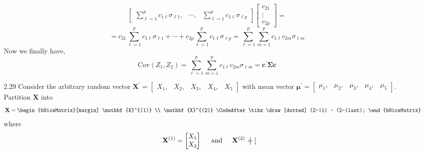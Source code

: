 \begin{enumerate}[font=\bfseries]
\[\begin{bmatrix}
                \sum_{\ell=1}^{p}{c_{1\ell}\sigma_{\ell 1}}, & \cdots, & \sum_{\ell=1}^{p}{c_{1\ell}\sigma_{\ell p}}
            \end{bmatrix}
            \begin{bmatrix}
                c_{21} \\
                \vdots \\
                c_{2p}
            \end{bmatrix}
            =
        \]
        \[
            =
            c_{21}\sum_{\ell=1}^{p}{c_{1\ell}\sigma_{\ell 1}} + \cdots + c_{2p}\sum_{\ell=1}^{p}{c_{1\ell}\sigma_{\ell p}}
            =
            \sum_{\ell=1}^{p}{\sum_{m=1}^{p}{c_{1\ell}c_{2m}\sigma_{\ell m}}}
        \]
        Now we finally have,
        \[
            \text{Cov}\left(Z_1, Z_2\right)
            =
            \sum_{\ell=1}^{p}{\sum_{m=1}^{p}{c_{1\ell}c_{2m}\sigma_{\ell m}}}
            =
            \mathbf{c}^\prime\mathbf{\Sigma}\mathbf{c}
        \]
        \item[2.29] Consider the arbitrary random vector $\mathbf{X}^\prime = \begin{bmatrix}
            X_1, & X_2, & X_3, & X_4, & X_5
        \end{bmatrix}$ with mean vector $\boldsymbol{\mu}^\prime = \begin{bmatrix}
            \mu_1, & \mu_2, & \mu_3, & \mu_4, & \mu_5
        \end{bmatrix}$. Partition $\mathbf{X}$ into
        \[
            \mathbf{X}
            =
            \begin{bNiceMatrix}[margin]
                \mathbf{X}^{(1)} \\
                \mathbf{X}^{(2)}
                \CodeAfter \tikz \draw[dotted] (2-|1) -- (2-|last);
            \end{bNiceMatrix}
        \]
        where
        \[
            \mathbf{X}^{(1)}
            =
            \begin{bmatrix}
                X_1 \\
                X_2
            \end{bmatrix}
            \hspace{0.2in}\text{and}\hspace{0.2in}
            \mathbf{X}^{(2)}
            =
            \begin{bmatrix}

\end{bmatrix}\]
\end{enumerate}
